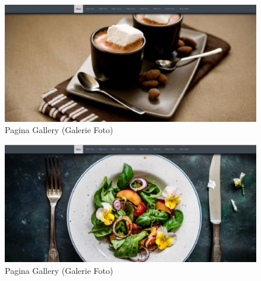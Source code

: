 \documentclass[11pt]{article}
\begin{document}
\begin{figure}[h]
\includegraphics{images/51.eps}
\caption{Pagina Gallery (Galerie Foto)}
\end{figure}

\begin{figure}[h]
\includegraphics{images/52.eps}
\caption{Pagina Gallery (Galerie Foto)}
\end{figure}
\end{document}

